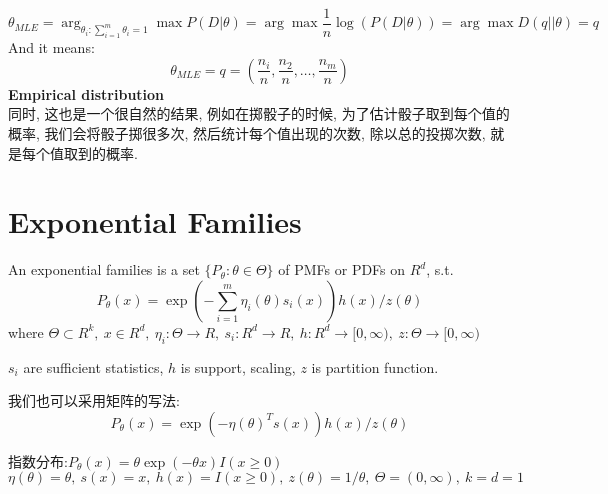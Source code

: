 \documentclass{article}
\begin{document}
$$
\theta_{MLE}
= \arg_{\theta_i: \sum_{i=1}^m \theta_i =1} \max P(D|\theta)
= \arg \max \dfrac{1}{n} \log(P(D|\theta))
= \arg \max D(q||\theta)
= q
$$
And it means:
$$\theta_{MLE} = q = (\dfrac{n_i}{n}, \dfrac{n_2}{n}, \ldots, \dfrac{n_m}{n})$$
\textbf{Empirical distribution}\\
同时, 这也是一个很自然的结果, 例如在掷骰子的时候, 为了估计骰子取到每个值的概率, 我们会将骰子掷很多次, 然后统计每个值出现的次数, 除以总的投掷次数, 就是每个值取到的概率.

\section{Exponential Families}
\begin{definition}
An exponential families is a set $\{ P_\theta: \theta \in \Theta \}$ of PMFs or PDFs on $R^d$, s.t.
$$P_\theta(x) = \exp(- \sum_{i=1}^m \eta_i(\theta) s_i(x)) h(x)/z(\theta)$$
where
$\Theta \subset R^k,\ x \in R^d,\ \eta_i: \Theta \rightarrow R,\ s_i:R^d \rightarrow R,\ h: R^d \rightarrow [0, \infty),\ z: \Theta \rightarrow [0, \infty)$
\end{definition}
$s_i$ are sufficient statistics, $h$ is support, scaling, $z$ is partition function.

我们也可以采用矩阵的写法:
$$P_\theta(x) = \exp(- \eta(\theta)^T s(x)) h(x)/z(\theta)$$

\begin{example}
指数分布:$P_\theta(x) = \theta \exp(-\theta x) I(x \geq 0)$\\
$\eta(\theta) = \theta,\ s(x) = x,\ h(x) = I(x \geq 0),\ z(\theta) = 1/\theta,\ \Theta = (0, \infty),\ k=d=1$
\end{example}
\end{document}
